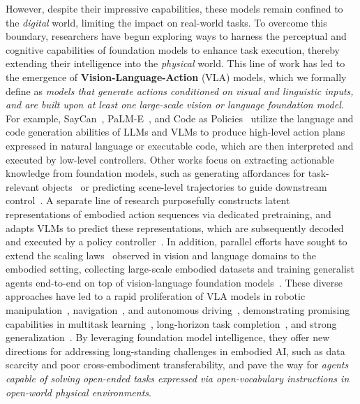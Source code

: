 \documentclass[10pt, a4paper, logo, copyright]{googledeepmind} %
\begin{document}
However, despite their impressive capabilities, these models remain confined to the \emph{digital} world, limiting the impact on real-world tasks. To overcome this boundary, researchers have begun exploring ways to harness the perceptual and cognitive capabilities of foundation models to enhance task execution, thereby extending their intelligence into the \emph{physical} world. This line of work has led to the emergence of \textbf{Vision-Language-Action} (VLA) models, which we formally define as \textit{models that generate actions conditioned on visual and linguistic inputs, and are built upon at least one large-scale vision or language foundation model}. For example, SayCan~\cite{saycan2022arxiv}, PaLM-E~\cite{driess2023palme}, and Code as Policies~\cite{liang2023code} utilize the language and code generation abilities of LLMs and VLMs to produce high-level action plans expressed in natural language or executable code, which are then interpreted and executed by low-level controllers. Other works focus on extracting actionable knowledge from foundation models, such as generating affordances for task-relevant objects~\cite{huang2023voxposer} or predicting scene-level trajectories to guide downstream control~\cite{gu2023rt}. A separate line of research purposefully constructs latent representations of embodied action sequences via dedicated pretraining, and adapts VLMs to predict these representations, which are subsequently decoded and executed by a policy controller~\cite{bu2025agibot}. In addition, parallel efforts have sought to extend the scaling laws~\cite{hoffmann2022training, kaplan2020scaling} observed in vision and language domains to the embodied setting, collecting large-scale embodied datasets and training generalist agents end-to-end on top of vision-language foundation models~\cite{kim2024openvla, black2410pi0, liu2024rdt}. These diverse approaches have led to a rapid proliferation of VLA models in robotic manipulation~\cite{shi2025hi, team2025gemini}, navigation~\cite{zhou2024navgpt, serpiva2025racevla}, and autonomous driving~\cite{covla_wacv2025, hwang2024emma, tian2024drivevlm}, 
demonstrating promising capabilities in multitask learning~\cite{rth2024arxiv}, long-horizon task completion~\cite{black2410pi0}, and strong generalization~\cite{zhong2025dexgraspvla}. By leveraging foundation model intelligence, they offer new directions for addressing long-standing challenges in embodied AI, such as data scarcity and poor cross-embodiment transferability, and pave the way for \emph{agents capable of solving open-ended tasks expressed via open-vocabulary instructions in open-world physical environments}.
\end{document}
